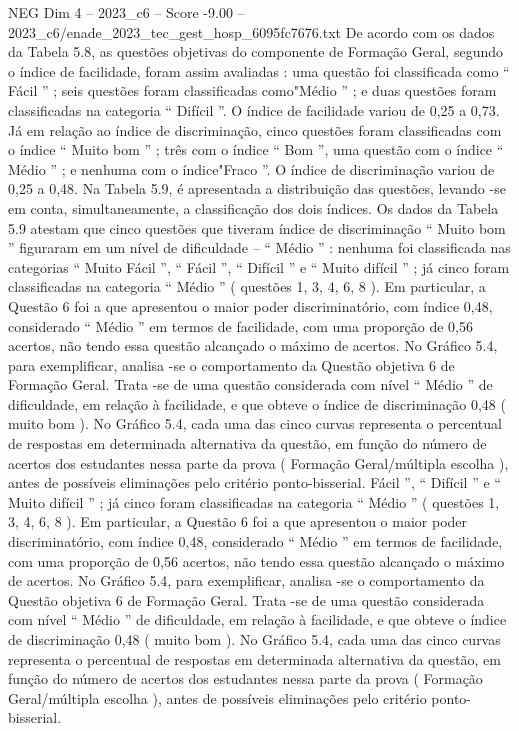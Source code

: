 \begin{textsample}{NEG Dim 4 – 2023\_c6 – Score -9.00 – 2023\_c6/enade\_2023\_tec\_gest\_hosp\_6095fc7676.txt}
De acordo com os dados da Tabela 5.8, as questões objetivas do componente de Formação Geral, segundo o índice de facilidade, foram assim avaliadas : uma questão foi classificada como “ Fácil ” ; seis questões foram classificadas como"Médio ” ; e duas questões foram classificadas na categoria “ Difícil ”.
O índice de facilidade variou de 0,25 a 0,73.
Já em relação ao índice de discriminação, cinco questões foram classificadas com o índice “ Muito bom ” ; três com o índice “ Bom ”, uma questão com o índice “ Médio ” ; e nenhuma com o índice"Fraco ”.
O índice de discriminação variou de 0,25 a 0,48.
Na Tabela 5.9, é apresentada a distribuição das questões, levando -se em conta, simultaneamente, a classificação dos dois índices.
Os dados da Tabela 5.9 atestam que cinco questões que tiveram índice de discriminação “ Muito bom ” figuraram em um nível de dificuldade – “ Médio ” : nenhuma foi classificada nas categorias “ Muito Fácil ”, “ Fácil ”, “ Difícil ” e “ Muito difícil ” ; já cinco foram classificadas na categoria “ Médio ” ( questões 1, 3, 4, 6, 8 ).
Em particular, a Questão 6 foi a que apresentou o maior poder discriminatório, com índice 0,48, considerado “ Médio ” em termos de facilidade, com uma proporção de 0,56 acertos, não tendo essa questão alcançado o máximo de acertos.
No Gráfico 5.4, para exemplificar, analisa -se o comportamento da Questão objetiva 6 de Formação Geral.
Trata -se de uma questão considerada com nível “ Médio ” de dificuldade, em relação à facilidade, e que obteve o índice de discriminação 0,48 ( muito bom ).
No Gráfico 5.4, cada uma das cinco curvas representa o percentual de respostas em determinada alternativa da questão, em função do número de acertos dos estudantes nessa parte da prova ( Formação Geral/múltipla escolha ), antes de possíveis eliminações pelo critério ponto-bisserial.
Fácil ”, “ Difícil ” e “ Muito difícil ” ; já cinco foram classificadas na categoria “ Médio ” ( questões 1, 3, 4, 6, 8 ).
Em particular, a Questão 6 foi a que apresentou o maior poder discriminatório, com índice 0,48, considerado “ Médio ” em termos de facilidade, com uma proporção de 0,56 acertos, não tendo essa questão alcançado o máximo de acertos.
No Gráfico 5.4, para exemplificar, analisa -se o comportamento da Questão objetiva 6 de Formação Geral.
Trata -se de uma questão considerada com nível “ Médio ” de dificuldade, em relação à facilidade, e que obteve o índice de discriminação 0,48 ( muito bom ).
No Gráfico 5.4, cada uma das cinco curvas representa o percentual de respostas em determinada alternativa da questão, em função do número de acertos dos estudantes nessa parte da prova ( Formação Geral/múltipla escolha ), antes de possíveis eliminações pelo critério ponto-bisserial.

\end{textsample}
